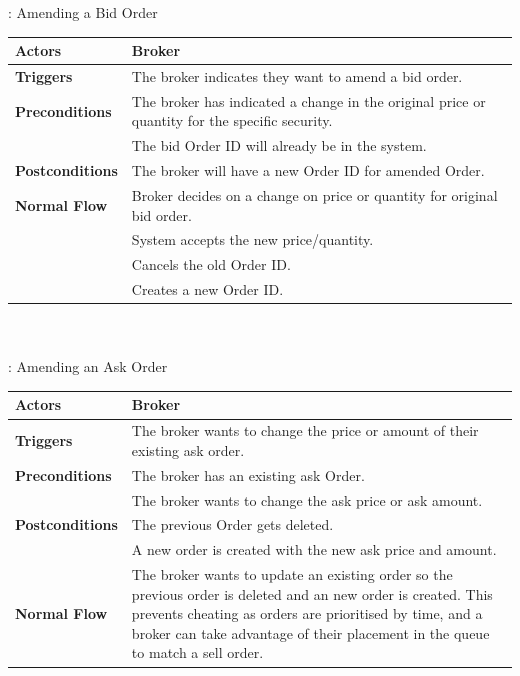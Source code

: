 \documentclass[a4paper]{article}
\begin{document}
: Amending a Bid Order \\ 
\begin{tabular}{ | l | p{10cm} |}\hline
	{\bf Actors} & Broker \\\hline
	{\bf Triggers} & The broker indicates they want to amend a bid order. \\\hline
	{\bf Preconditions} & The broker has indicated a change in the original price or quantity for the specific security. \\
	& The bid Order ID will already be in the system.  \\\hline
	{\bf Postconditions} & The broker will have a new Order ID for amended Order. \\\hline
	{\bf Normal Flow} & Broker decides on a change on price or quantity for original bid order. \\
	& System accepts the new price/quantity. \\
	& Cancels the old Order ID. \\
	& Creates a new Order ID. \\\hline
\end{tabular} \\\\

: Amending an Ask Order \\ 
\begin{tabular}{ | l | p{10cm} |}\hline
	{\bf Actors} & Broker \\\hline
	{\bf Triggers} & The broker wants to change the price or amount of their existing ask order.  \\\hline
	{\bf Preconditions} & The broker has an existing ask Order. \\
	& The broker wants to change the ask price or ask amount. \\\hline
	{\bf Postconditions} & The previous Order gets deleted. \\
	& A new order is created with the new ask price and amount. \\\hline
	{\bf Normal Flow} & The broker wants to update an existing order so the previous order is deleted and an new order is created. This prevents cheating as orders are prioritised by time, and a broker can take advantage of their placement in the queue to match a sell order. \\\hline
\end{tabular} \\\\
\end{document}
